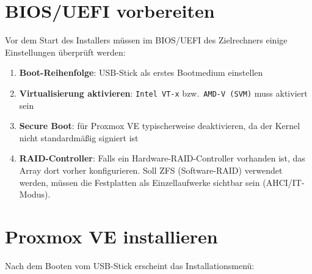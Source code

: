 \documentclass[11pt, oneside, numbers=noenddot]{scrbook}
\begin{document}
\section{BIOS/UEFI vorbereiten}
Vor dem Start des Installers müssen im BIOS/UEFI des Zielrechners einige Einstellungen überprüft werden:

\begin{enumerate}
  \item \textbf{Boot-Reihenfolge}: USB-Stick als erstes Bootmedium einstellen
  \item \textbf{Virtualisierung aktivieren}: \texttt{Intel VT-x} bzw.\ \texttt{AMD-V (SVM)} muss aktiviert sein
  \item \textbf{Secure Boot}: für Proxmox VE typischerweise deaktivieren, da der Kernel nicht standardmäßig signiert ist
  \item \textbf{RAID-Controller}: Falls ein Hardware-RAID-Controller vorhanden ist, das Array dort vorher konfigurieren. Soll ZFS (Software-RAID) verwendet werden, müssen die Festplatten als Einzellaufwerke sichtbar sein (AHCI/IT-Modus).
\end{enumerate}

\section{Proxmox VE installieren}
Nach dem Booten vom USB-Stick erscheint das Installationsmenü:
\end{document}
